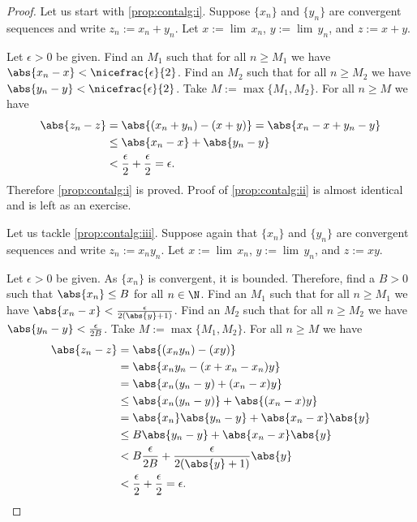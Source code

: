 \documentclass[12pt]{book}
\begin{document}
\begin{proof}
Let us start with \ref{prop:contalg:i}.
Suppose $\{ x_n \}$ and $\{ y_n \}$ are convergent sequences and
write $z_n := x_n + y_n$.
Let $x := \lim\, x_n$,
$y := \lim\, y_n$, and $z := x+y$.

Let $\epsilon > 0$ be given.
Find an $M_1$ such that for all $n \geq M_1$
we have
$\abs{x_n - x} < \nicefrac{\epsilon}{2}$.  
Find an $M_2$ such that for all $n \geq M_2$
we have
$\abs{y_n - y} < \nicefrac{\epsilon}{2}$.
Take $M := \max \{ M_1, M_2 \}$.
For all $n \geq M$ we have
\begin{equation*}
\begin{split}
\abs{z_n - z} &=
\abs{(x_n+y_n) - (x+y)} =
\abs{x_n-x + y_n-y} \\
& \leq
\abs{x_n-x} + \abs{y_n-y} \\
& <
\frac{\epsilon}{2} +
\frac{\epsilon}{2}
= \epsilon.
\end{split}
\end{equation*}
Therefore \ref{prop:contalg:i} is proved.
Proof of \ref{prop:contalg:ii} is almost identical and is left as an
exercise.

Let us tackle 
\ref{prop:contalg:iii}.
Suppose again that $\{ x_n \}$ and $\{ y_n \}$ are convergent sequences and
write $z_n := x_n y_n$.
Let $x := \lim\, x_n$,
$y := \lim\, y_n$, and $z := xy$.

Let $\epsilon > 0$ be given.
As $\{ x_n \}$ is convergent, it is bounded.
Therefore, find
a $B >0$ such that $\abs{x_n} \leq B$ for all $n \in \N$.
Find an $M_1$ such that for all $n \geq M_1$
we have
$\abs{x_n - x} < \frac{\epsilon}{2(\abs{y}+1)}$.  
Find an $M_2$ such that for all $n \geq M_2$
we have
$\abs{y_n - y} < \frac{\epsilon}{2B}$.
Take $M := \max \{ M_1, M_2 \}$.
For all $n \geq M$ we have
\begin{equation*}
\begin{split}
\abs{z_n - z} &=
\abs{(x_ny_n) - (xy)} \\
& =
\abs{x_ny_n - (x+x_n-x_n)y} \\
& =
\abs{x_n(y_n -y) + (x_n - x)y} \\
& \leq
\abs{x_n(y_n -y)} + \abs{(x_n - x)y} \\
& =
\abs{x_n}\abs{y_n -y} + \abs{x_n - x}\abs{y} \\
& \leq
B\abs{y_n -y} + \abs{x_n - x}\abs{y} \\
& <
B\frac{\epsilon}{2B} + \frac{\epsilon}{2(\abs{y}+1)}\abs{y}
\\
& <
\frac{\epsilon}{2} + \frac{\epsilon}{2} = \epsilon .
\end{split}
\end{equation*}


\end{proof}
\end{document}
